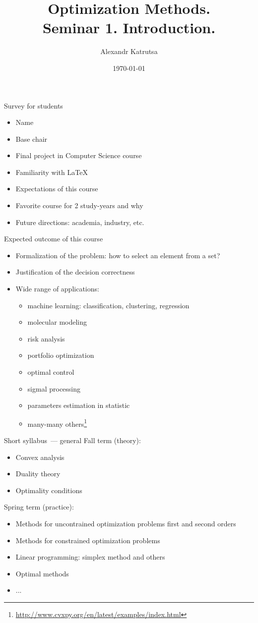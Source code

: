 \documentclass[12pt]{beamer}
\title[Seminar 1]{Optimization Methods. \\
Seminar 1. Introduction.}
\author{Alexandr Katrutsa}
\institute{Moscow Institute of Physics and Technology\\
Department of Control and Applied Mathematics}
\date{\today}
\begin{document}
\begin{frame}
\titlepage
\end{frame}

\begin{frame}{Survey for students}
\begin{itemize}
\item Name
\item Base chair
\item Final project in Computer Science course
\item Familiarity with \LaTeX
\item Expectations of this course
\item Favorite course for 2 study-years and why
\item Future directions: academia, industry, etc.
\end{itemize}

\end{frame}

\begin{frame}{Expected outcome of this course}
\begin{itemize}
\item Formalization of the problem: how to select an element from a set?
\item Justification of the decision correctness
\item Wide range of applications:
\begin{itemize}
\item machine learning: classification, clustering, regression
\item molecular modeling
\item risk analysis
\item portfolio optimization
\item optimal control
\item sigmal processing
\item parameters estimation in statistic
\item many-many others\footnote{\url{http://www.cvxpy.org/en/latest/examples/index.html}}
\end{itemize}
\end{itemize}
\end{frame}

\begin{frame}{Short syllabus~--- general}
Fall term (theory):
\begin{itemize}
\item Convex analysis
\item Duality theory
\item Optimality conditions
\end{itemize}

Spring term (practice):
\begin{itemize}
\item Methods for uncontrained optimization problems first and second orders
\item Methods for constrained optimization problems
\item Linear programming: simplex method and others
\item Optimal methods
\item ...
\end{itemize}
\end{frame}
\end{document}
